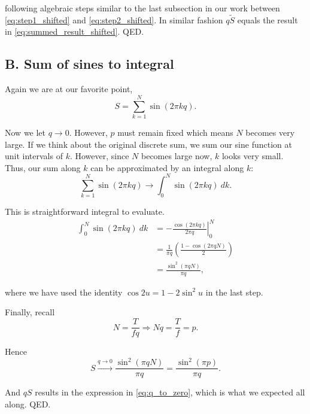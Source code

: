 \documentclass[11pt]{article}
\begin{document}
following algebraic steps similar to the last subsection in our work between \eqref{eq:step1_shifted} and \eqref{eq:step2_shifted}. In similar fashion $q\tilde{S}$ equals the result in \eqref{eq:summed_result_shifted}. QED.

\subsection*{B. Sum of sines to integral}
\label{subsec:sum_to_int}

\renewcommand{\theequation}{B.\arabic{equation}}
Again we are at our favorite point,
\begin{equation}
S = \sum_{k=1}^{N} \sin (2 \pi k q).
\end{equation}

Now we let $q \rightarrow 0$. However, $p$ must remain fixed which means $N$ becomes very large. If we think about the original discrete sum, we sum our sine function at unit intervals of $k$. However, since $N$ becomes large now, $k$ looks very small. Thus, our sum along $k$ can be approximated by an integral along $k$:
\begin{equation}
\sum_{k=1}^{N} \sin (2 \pi k q) \rightarrow \int_0^N{\sin(2\pi k q) \: dk}.
\end{equation}

This is straightforward integral to evaluate.
\begin{align}
\int_0^N{\sin(2\pi k q) \: dk} &= -\left.\frac{\cos(2\pi k q)}{2\pi q}\right\vert_{0}^{N}  \\[0.5em]
&= \frac{1}{\pi q} \left(\frac{1 - \cos(2\pi q N)}{2}\right) \nonumber \\[0.5em]
&= \frac{\sin^2(\pi q N)}{\pi q},
\end{align}

where we have used the identity $\cos 2u = 1 - 2\sin^2 u$ in the last step. \\

\par Finally, recall
$$
N = \frac{T}{fq} \Rightarrow Nq = \frac{T}{f} = p.
$$

Hence
\begin{equation}
S \xrightarrow{q \rightarrow 0} \frac{\sin^2(\pi q N)}{\pi q} = \frac{\sin^2(\pi p)}{\pi q}.
\end{equation}

And $qS$ results in the expression in \eqref{eq:q_to_zero}, which is what we expected all along. QED.
\end{document}
